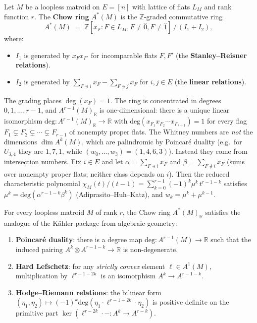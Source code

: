 \begin{definition}\label{def:chowring}
Let $M$ be a loopless matroid on $E = [n]$ with lattice of flats $L_M$
and rank function $r$. The \textbf{Chow ring} $A^*(M)$ is the
$\mathbb Z$-graded commutative ring
\[
  A^*(M) \;=\; \mathbb Z[x_F : F \in L_M, F \ne \hat 0, F \ne \hat 1]\, /\, (I_1 + I_2),
\]
where:
\begin{itemize}
  \item $I_1$ is generated by $x_F x_{F'}$ for incomparable flats
        $F, F'$ (the \textbf{Stanley--Reisner relations}).
  \item $I_2$ is generated by
        $\sum_{F \ni i} x_F - \sum_{F \ni j} x_F$ for $i, j \in E$
        (the \textbf{linear relations}).
\end{itemize}
The grading places $\deg(x_F) = 1$. The ring is concentrated in
degrees $0, 1, \ldots, r - 1$, and $A^{r-1}(M)_{\mathbb R}$ is
one-dimensional: there is a unique linear isomorphism
$\mathrm{deg} : A^{r-1}(M)_{\mathbb R} \to \mathbb R$ with
$\mathrm{deg}(x_{F_1} x_{F_2} \cdots x_{F_{r-1}}) = 1$ for every flag
$F_1 \subsetneq F_2 \subsetneq \cdots \subsetneq F_{r-1}$ of nonempty
proper flats. The Whitney numbers are \emph{not} the dimensions
$\dim A^k(M)$, which are palindromic by Poincar\'e duality (e.g.\ for
$U_{3,4}$ they are $1, 7, 1$, while $(w_0, \ldots, w_3) = (1, 4, 6, 3)$).
Instead they come from intersection numbers. Fix $i \in E$ and let
$\alpha = \sum_{F \ni i} x_F$ and $\beta = \sum_{F \not\ni i} x_F$
(sums over nonempty proper flats; neither class depends on $i$). Then
the reduced characteristic polynomial
$\chi_M(t)/(t - 1) = \sum_{k = 0}^{r - 1} (-1)^k \mu^k\, t^{r - 1 - k}$
satisfies $\mu^k = \mathrm{deg}(\alpha^{r - 1 - k} \beta^k)$
(Adiprasito--Huh--Katz), and $w_k = \mu^k + \mu^{k-1}$.
\end{definition}

\begin{theorem}\label{thm:hodgepkg}
For every loopless matroid $M$ of rank $r$, the Chow ring $A^*(M)_{\mathbb R}$
satisfies the analogue of the K\"ahler package from algebraic
geometry:
\begin{enumerate}
  \item \textbf{Poincar\'e duality}: there is a degree map
        $\mathrm{deg} : A^{r - 1}(M) \to \mathbb R$ such that the
        induced pairing $A^k \otimes A^{r - 1 - k} \to \mathbb R$ is
        non-degenerate.
  \item \textbf{Hard Lefschetz}: for any \emph{strictly convex}
        element $\ell \in A^1(M)$, multiplication by $\ell^{r - 1 - 2k}$
        is an isomorphism $A^k \to A^{r - 1 - k}$.
  \item \textbf{Hodge--Riemann relations}: the bilinear form
        $(\eta_1, \eta_2) \mapsto (-1)^k \mathrm{deg}(\eta_1 \cdot \ell^{r - 1 - 2k} \cdot \eta_2)$
        is positive definite on the primitive part
        $\ker(\ell^{r - 2k} \cdot - : A^k \to A^{r - k})$.
\end{enumerate}
\end{theorem}

